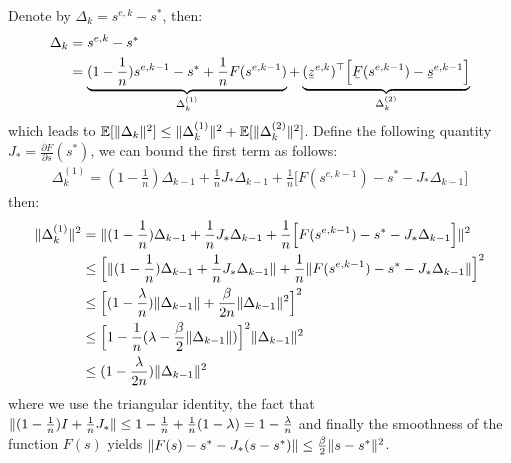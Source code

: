 \documentclass[11pt]{article}
\theoremstyle{plain}
\begin{document}
Denote by $\Delta_k = s^{e,k} - s^*$, then:
\begin{equation}
\begin{split}
\Delta_k & = s^{e,k} - s^* \\
& = \underbrace{(1-\frac{1}{n}) s^{e,k-1} - s^*  +  \frac{1}{n}  F(s^{e,k-1})}_{\Delta_k^{(1)}}  + \underbrace{(\barbelow{z}^{e,k})^\top \Big[ \barbelow{F}(s^{e,k-1}) - \barbelow{s}^{e,k-1} \Big]}_{\Delta_k^{(2)}}
\end{split}
\end{equation}
which leads to $\operatorname*{\mathbb{E}}[\lVert\Delta_k\rVert^2] \leq \lVert\Delta_k^{(1)}\rVert^2 + \operatorname*{\mathbb{E}}[\lVert\Delta_k^{(2)}\rVert^2] $.
Define the following quantity $J_* = \frac{\partial F}{\partial s}(s^*)$, we can bound the first term as follows:
\begin{equation}
\begin{split}
\Delta_k^{(1)} = (1-\frac{1}{n})\Delta_{k-1} + \frac{1}{n}J_* \Delta_{k-1} +  \frac{1}{n} \Big[ F(s^{e,k-1}) - s^* -J_* \Delta_{k-1}\Big]
\end{split}
\end{equation}
then:
\begin{equation}
\begin{split}
\lVert\Delta_k^{(1)}\rVert^2 & = \lVert(1-\frac{1}{n})\Delta_{k-1} + \frac{1}{n} J_* \Delta_{k-1} +  \frac{1}{n} \Big[ F(s^{e,k-1}) - s^* -J_* \Delta_{k-1}\Big]\rVert^2 \\
& \leq \Big[ \lVert(1-\frac{1}{n}) \Delta_{k-1} + \frac{1}{n}J_* \Delta_{k-1} \rVert + \frac{1}{n} \lVert F(s^{e,k-1}) - s^* -J_* \Delta_{k-1}\rVert\Big]^2 \\
& \leq \Big[ (1-\frac{\lambda}{n})\lVert\Delta_{k-1}\rVert + \frac{\beta}{2n} \lVert\Delta_{k-1}\rVert^2 \Big]^2\\
& \leq \Big[ 1 - \frac{1}{n}(\lambda - \frac{\beta}{2} \lVert\Delta_{k-1}\rVert) \Big]^2 \lVert\Delta_{k-1}\rVert^2\\
& \leq (1 - \frac{\lambda}{2n})\lVert\Delta_{k-1}\rVert^2
\end{split}
\end{equation}
where we use the triangular identity, the fact that $\lVert(1 - \frac{1}{n})I + \frac{1}{n} J_*\rVert \leq 1 - \frac{1}{n} + \frac{1}{n}(1-\lambda) = 1 - \frac{\lambda}{n}$ and finally the smoothness of the function $F(s)$ yields $\lVert F(s) - s^* - J_* (s - s^*)\rVert \leq \frac{\beta}{2}\lVert s - s^*\rVert^2$.
\end{document}
